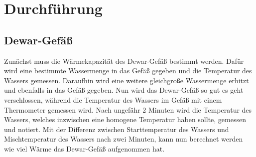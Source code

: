 \section{Durchführung}
\label{sec:Durchführung}

\subsection{Dewar-Gefäß}
Zunächst muss die Wärmekapazität des Dewar-Gefäß bestimmt werden.
Dafür wird eine bestimmte Wassermenge in das Gefäß gegeben und die Temperatur des Wassers gemessen.
Daraufhin wird eine weitere gleichgroße Wassermenge erhitzt und ebenfalls in das Gefäß gegeben.
Nun wird das Dewar-Gefäß so gut es geht verschlossen, während die Temperatur des Wassers im Gefäß mit einem Thermometer gemessen wird.
Nach ungefähr 2 Minuten wird die Temperatur des Wassers, welches inzwischen eine homogene Temperatur haben sollte, gemessen und notiert.
Mit der Differenz zwischen Starttemperatur des Wassers und Mischtemperatur des Wassers nach zwei Minuten, kann nun berechnet werden wie viel Wärme das Dewar-Gefäß aufgenommen hat.

